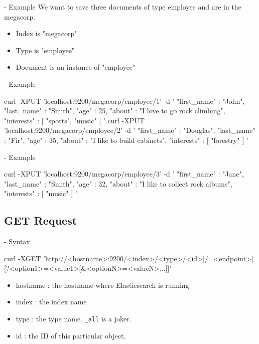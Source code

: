 \documentclass[]{beamer}
\begin{document}
\begin{frame}{\subsecname{} - Example}
  We want to save three documents of type employee and are in the megacorp.

  \begin{itemize}
    \item Index is "megacorp"
    \item Type is "employee"
    \item Document is an instance of "employee"
  \end{itemize}
\end{frame}

\begin{frame}[containsverbatim]{\subsecname{} - Example}
  \begin{command}
curl -XPUT 'localhost:9200/megacorp/employee/1' -d '
{
  "first_name" : "John",
  "last_name"  : "Smith",
  "age"        : 25,
  "about"      : "I love to go rock climbing",
  "interests"  : [ "sports", "music" ]
}'
curl -XPUT 'localhost:9200/megacorp/employee/2' -d '
{
  "first_name" : "Douglas",
  "last_name"  : "Fir",
  "age"        : 35,
  "about"      : "I like to build cabinets",
  "interests"  : [ "forestry" ]
}'
  \end{command}
\end{frame}

\begin{frame}[containsverbatim]{\subsecname{} - Example}
  \begin{command}
curl -XPUT 'localhost:9200/megacorp/employee/3' -d '
{
  "first_name" : "Jane",
  "last_name"  : "Smith",
  "age"        : 32,
  "about"      : "I like to collect rock albums",
  "interests"  : [ "music" ]
}'
  \end{command}
\end{frame}

\subsection{GET Request}

\begin{frame}[containsverbatim]{\subsecname{} - Syntax}
  \begin{command}
curl -XGET 'http://<hostname>:9200/<index>/<type>/<id>[/_<endpoint>][?<option1>=<value1>[&<optionN>=<valueN>...]]'
  \end{command}

  \begin{itemize}
    \item hostname : the hostname where Elasticsearch is running
    \item index : the index name
    \item type : the type name. \texttt{\_all} is a joker.
    \item id : the ID of this particular object.
  \end{itemize}
\end{frame}
\end{document}
